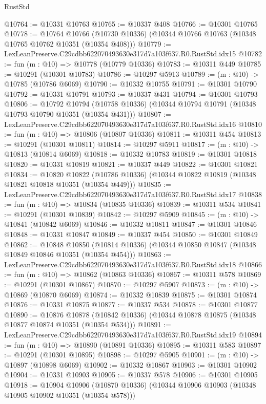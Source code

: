 \begin{lexlean}{RustStd}
\begin{coremodule}
@10764 := @10331 @10763
@10765 := @10337 @408
@10766 := @10301 @10765
@10778 := @10764
    @10766
    (@10730 @10336)
    (@10344 @10766 @10763 (@10348 @10765 @10762 @10351 (@10354 @408)))
@10779 := LexLeanPreserve.C29cdbb622070493630e317d7a103f637.R0.RustStd.idx15
@10782 := fun (m : @10) => @10778 (@10779 @10336)
@10783 := @10311 @449
@10785 := @10291 (@10301 @10783)
@10786 := @10297 @5913
@10789 := (m : @10) -> @10785 (@10786 @6069)
@10790 := @10332 @10755
@10791 := @10301 @10790
@10792 := @10331 @10791
@10793 := @10337 @431
@10794 := @10301 @10793
@10806 := @10792
    @10794
    (@10758 @10336)
    (@10344 @10794 @10791 (@10348 @10793 @10790 @10351 (@10354 @431)))
@10807 := LexLeanPreserve.C29cdbb622070493630e317d7a103f637.R0.RustStd.idx16
@10810 := fun (m : @10) => @10806 (@10807 @10336)
@10811 := @10311 @454
@10813 := @10291 (@10301 @10811)
@10814 := @10297 @5911
@10817 := (m : @10) -> @10813 (@10814 @6069)
@10818 := @10332 @10783
@10819 := @10301 @10818
@10820 := @10331 @10819
@10821 := @10337 @449
@10822 := @10301 @10821
@10834 := @10820
    @10822
    (@10786 @10336)
    (@10344 @10822 @10819 (@10348 @10821 @10818 @10351 (@10354 @449)))
@10835 := LexLeanPreserve.C29cdbb622070493630e317d7a103f637.R0.RustStd.idx17
@10838 := fun (m : @10) => @10834 (@10835 @10336)
@10839 := @10311 @534
@10841 := @10291 (@10301 @10839)
@10842 := @10297 @5909
@10845 := (m : @10) -> @10841 (@10842 @6069)
@10846 := @10332 @10811
@10847 := @10301 @10846
@10848 := @10331 @10847
@10849 := @10337 @454
@10850 := @10301 @10849
@10862 := @10848
    @10850
    (@10814 @10336)
    (@10344 @10850 @10847 (@10348 @10849 @10846 @10351 (@10354 @454)))
@10863 := LexLeanPreserve.C29cdbb622070493630e317d7a103f637.R0.RustStd.idx18
@10866 := fun (m : @10) => @10862 (@10863 @10336)
@10867 := @10311 @578
@10869 := @10291 (@10301 @10867)
@10870 := @10297 @5907
@10873 := (m : @10) -> @10869 (@10870 @6069)
@10874 := @10332 @10839
@10875 := @10301 @10874
@10876 := @10331 @10875
@10877 := @10337 @534
@10878 := @10301 @10877
@10890 := @10876
    @10878
    (@10842 @10336)
    (@10344 @10878 @10875 (@10348 @10877 @10874 @10351 (@10354 @534)))
@10891 := LexLeanPreserve.C29cdbb622070493630e317d7a103f637.R0.RustStd.idx19
@10894 := fun (m : @10) => @10890 (@10891 @10336)
@10895 := @10311 @583
@10897 := @10291 (@10301 @10895)
@10898 := @10297 @5905
@10901 := (m : @10) -> @10897 (@10898 @6069)
@10902 := @10332 @10867
@10903 := @10301 @10902
@10904 := @10331 @10903
@10905 := @10337 @578
@10906 := @10301 @10905
@10918 := @10904
    @10906
    (@10870 @10336)
    (@10344 @10906 @10903 (@10348 @10905 @10902 @10351 (@10354 @578)))

\end{coremodule}
\end{lexlean}
